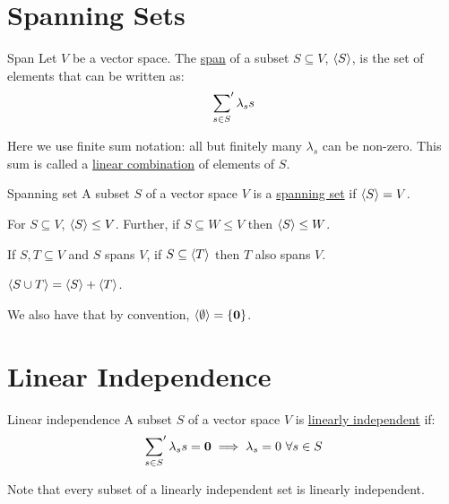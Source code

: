 \documentclass[../Main.tex]{subfiles}
\begin{document}
\section{Spanning Sets}
\begin{definition}{Span}
    Let $V$ be a vector space. The \underline{span} of a subset $S \subseteq V$, $\left\langle S \right\rangle$, is the set of elements that can be written as:
    \begin{equation*}
        \sideset{}{'}\sum_{s \in S} \lambda_s s
    \end{equation*}
\end{definition}
Here we use finite sum notation: all but finitely many $\lambda_s$ can be non-zero. This sum is called a \underline{linear combination} of elements of $S$.
\begin{definition}{Spanning set}
    A subset $S$ of a vector space $V$ is a \underline{spanning set} if $\left\langle S \right\rangle = V$.
\end{definition}
\begin{propositions}{
        
        \label{propsSpanning}
    }
    \item For $S \subseteq V$, $\left\langle S \right\rangle \leq V$. Further, if $S \subseteq W \leq V$ then $\left\langle S \right\rangle \leq W$.
    \item If $S, T \subseteq V$ and $S$ spans $V$, if $S \subseteq \left\langle T \right\rangle$ then $T$ also spans $V$.
    \item $\left\langle S \cup T \right\rangle = \left\langle S \right\rangle + \left\langle T \right\rangle$.
\end{propositions}
We also have that by convention, $\left\langle \emptyset \right\rangle = \{\boldsymbol{0}\}$.
\section{Linear Independence}
\begin{definition}{Linear independence}
    A subset $S$ of a vector space $V$ is \underline{linearly independent} if:
    \begin{equation*}
        \sideset{}{'}\sum_{s \in S} \lambda_s s = \boldsymbol{0} \implies \lambda_s = 0~\forall s\in S
    \end{equation*}
\end{definition}
Note that every subset of a linearly independent set is linearly independent.
\end{document}
